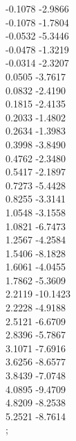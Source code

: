 {    -0.1078	-2.9866\\
    -0.1078	-1.7804\\
    -0.0532	-5.3446\\
    -0.0478	-1.3219\\
    -0.0314	-2.3207\\
    0.0505	-3.7617\\
    0.0832	-2.4190\\
    0.1815	-2.4135\\
    0.2033	-1.4802\\
    0.2634	-1.3983\\
    0.3998	-3.8490\\
    0.4762	-2.3480\\
    0.5417	-2.1897\\
    0.7273	-5.4428\\
    0.8255	-3.3141\\
    1.0548	-3.1558\\
    1.0821	-6.7473\\
    1.2567	-4.2584\\
    1.5406	-8.1828\\
    1.6061	-4.0455\\
    1.7862	-5.3609\\
    2.2119	-10.1423\\
    2.2228	-4.9188\\
    2.5121	-6.6709\\
    2.8396	-5.7867\\
    3.1071	-7.6916\\
    3.6256	-8.6577\\
    3.8439	-7.0748\\
    4.0895	-9.4709\\
    4.8209	-8.2538\\
    5.2521	-8.7614\\
    };
